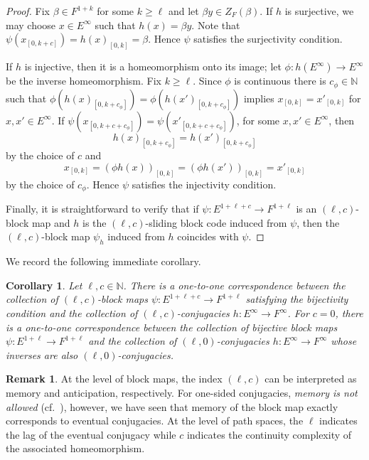 \documentclass[12pt,a4paper,oneside,reqno,final]{amsart}
\newcommand{\LRA}{\longrightarrow}
\newcommand{\N}{\mathbb{N}}
\let\geq\geqslant{}
\newtheorem{corollary}[lemma]{Corollary}
\theoremstyle{definition}
\newtheorem{remark}[lemma]{Remark}
\numberwithin{equation}{section} %
\begin{document}
\begin{proof}
Fix $\beta\in F^{1 + k}$ for some $k \geq \ell$ and let $\beta y\in Z_F(\beta)$.
If $h$ is surjective, we may choose $x\in E^\infty$ such that $h(x) = \beta y$.
Note that $\psi(x_{[0, k + c]}) = {h(x)}_{[0, k]} = \beta$.
Hence $\psi$ satisfies the surjectivity condition.

If $h$ is injective, then it is a homeomorphism onto its image;
let $\phi\colon h(E^\infty) \LRA E^\infty$ be the inverse homeomorphism.
Fix $k\geq \ell$.
Since $\phi$ is continuous there is $c_\phi\in \N$ such that $\phi({h(x)}_{[0, k + c_\phi]}) = \phi({h(x')}_{[0, k + c_\phi]})$ implies $x_{[0, k]} = x'_{[0, k]}$ for $x, x'\in E^\infty$.
If $\psi(x_{[0, k + c + c_\phi]}) = \psi(x'_{[0, k + c + c_\phi]})$, for some $x, x'\in E^\infty$,
then
\[
    {h(x)}_{[0, k + c_\phi]} = {h(x')}_{[0, k + c_\phi]}
\]
by the choice of $c$ and      
\[
    x_{[0, k]} = {(\phi h(x))}_{[0, k]} = {(\phi h(x'))}_{[0, k]} = x'_{[0, k]}
\]
by the choice of $c_\phi$.
Hence $\psi$ satisfies the injectivity condition.

Finally, it is straightforward to verify that if $\psi\colon E^{1 + \ell + c}\LRA F^{1 + \ell}$ is an $(\ell, c)$-block map
and $h$ is the $(\ell, c)$-sliding block code induced from $\psi$, then the $(\ell, c)$-block map $\psi_h$ induced from $h$ coincides with $\psi$.
\end{proof}

We record the following immediate corollary.

\begin{corollary}\label{cor:1:1}
    Let $\ell, c\in \N$.
    There is a one-to-one correspondence between the collection of $(\ell, c)$-block maps $\psi\colon E^{1 + \ell + c}\LRA F^{1 + \ell}$ 
    satisfying the \emph{bijectivity condition} and the collection of $(\ell, c)$-conjugacies $h\colon E^\infty\LRA F^\infty$.
    For $c = 0$, there is a one-to-one correspondence between the collection of \emph{bijective} block maps $\psi\colon E^{1 + \ell}\LRA F^{1 + \ell}$ 
    and the collection of $(\ell,0)$-conjugacies $h\colon E^\infty \LRA F^\infty$ whose inverses are also $(\ell, 0)$-conjugacies.
\end{corollary}

\begin{remark}
    At the level of block maps, the index $(\ell, c)$ can be interpreted as memory and anticipation, respectively. 
    For one-sided conjugacies, \emph{memory is not allowed} (cf.~\cite[Section 13.8]{LM}), however, we have seen that memory of the block map
    exactly corresponds to eventual conjugacies.
    At the level of path spaces, the $\ell$ indicates the lag of the eventual conjugacy while $c$ indicates the continuity complexity of the associated homeomorphism.
\end{remark}
\end{document}
